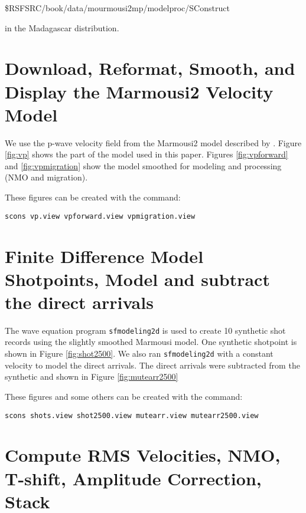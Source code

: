  \$RSFSRC/book/data/mourmousi2mp/modelproc/SConstruct 

in the Madagascar distribution.

\section{Download, Reformat, Smooth, and Display the Marmousi2 Velocity Model}
We use the p-wave velocity field from the Marmousi2 model described by  
\cite{irons}.  Figure \ref{fig:vp} shows the part of the model used in this 
paper.  Figures \ref{fig:vpforward} and \ref{fig:vpmigration} show the model 
smoothed for modeling and processing (NMO and migration). 

These figures can be created with the command:
\begin{verbatim}
scons vp.view vpforward.view vpmigration.view
\end{verbatim}


\section{Finite Difference Model Shotpoints, Model and subtract the direct arrivals}

The wave equation program \texttt{sfmodeling2d} \cite[]{Yang} is used
to create 10 synthetic shot records using the slightly smoothed
Marmousi model.  One synthetic shotpoint is shown in
Figure \ref{fig:shot2500}. We also ran \texttt{sfmodeling2d} with a
constant velocity to model the direct arrivals.  The direct arrivals
were subtracted from the synthetic and shown in Figure
\ref{fig:mutearr2500} 

These figures and some others can be created with the command:
\begin{verbatim}
scons shots.view shot2500.view mutearr.view mutearr2500.view
\end{verbatim}


\section{Compute RMS Velocities, NMO, T-shift, Amplitude Correction, Stack}

